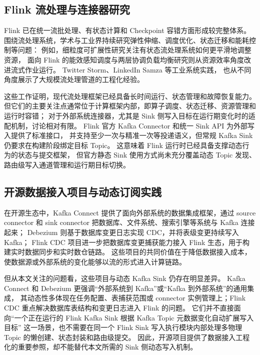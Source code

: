 \subsection{Flink 流处理与连接器研究}

Flink 已在统一流批处理、有状态计算和 Checkpoint 容错方面形成较完整体系\cite{carbone2015flink}。
围绕流处理系统，学术与工业界持续研究弹性伸缩、调度优化、状态迁移和能耗控制等问题：
例如，细粒度可扩展性研究关注有状态流处理系统如何更平滑地调整资源\cite{qiu2025finegrained}，
面向 Flink 的能效感知调度与两层协调负载均衡研究则从资源效率角度改进流式作业运行\cite{li2025flinkenergy}。
Twitter Storm\cite{toshniwal2014storm}、LinkedIn Samza\cite{noghabi2017samza} 等工业系统实践，
也从不同角度展示了大规模流处理管道的工程化经验。

这些工作证明，现代流处理框架已经具备长时间运行、状态管理和故障恢复能力。
但它们的主要关注点通常位于计算框架内部，即算子调度、状态迁移、资源管理和运行时容错；
对于外部系统连接器，尤其是 Sink 侧写入目标在运行期变化时的适配机制，讨论相对有限。
Flink 官方 Kafka Connector 和统一 Sink API 为外部写入提供了标准接口\cite{flinkKafkaDocs,flinkUnifiedSink}，
并支持至少一次与精准一次等投递语义，但常规 Kafka Sink 仍要求在构建阶段绑定目标 Topic。
这意味着 Flink 运行时已经具备支撑动态行为的状态与提交框架，
但官方静态 Sink 使用方式尚未充分覆盖动态 Topic 发现、路由级写入通道管理和运行期目标切换。

\subsection{开源数据接入项目与动态订阅实践}

在开源生态中，Kafka Connect 提供了面向外部系统的数据集成框架，通过 source connector 和 sink connector
把数据库、文件系统、搜索引擎等系统与 Kafka 连接起来\cite{kafkaConnectDocs}；
Debezium 则基于数据库变更日志实现 CDC，并将表级变更持续写入 Kafka\cite{debeziumDocs}；
Flink CDC 项目进一步把数据库变更捕获能力接入 Flink 生态，用于构建实时数据同步和实时数仓链路\cite{flinkCdcDocs}。
这些项目的共同价值在于降低数据接入成本，使数据源或外部系统的变化能够以流的形式进入计算链路。

但从本文关注的问题看，这些项目与动态 Kafka Sink 仍存在明显差异。
Kafka Connect 和 Debezium 更强调“外部系统到 Kafka”或“Kafka 到外部系统”的通用集成，
其动态性多体现在任务配置、表捕获范围或 connector 实例管理上；Flink CDC 重点解决数据库表结构和变更日志进入 Flink 的问题。
它们并不直接面向“一个正在运行的 Flink Kafka Sink 根据 Kafka Topic 元数据变化自动扩展写入目标”
这一场景，也不需要在同一个 Flink Sink 写入执行模块内部处理多物理 Topic 的懒创建、状态封装和路由级提交。
因此，开源项目提供了数据接入工程化的重要参照，却不能替代本文所需的 Sink 侧动态写入机制。

